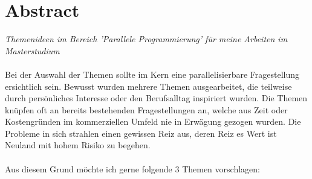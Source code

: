 \documentclass{article}
\begin{document}
\section*{Abstract}
\textit{Themenideen im Bereich 'Parallele Programmierung' für meine Arbeiten im Masterstudium} \\
\vspace{3pt} \\
Bei der Auswahl der Themen sollte im Kern eine parallelisierbare Fragestellung ersichtlich sein. Bewusst wurden mehrere Themen ausgearbeitet, die teilweise durch persönliches Interesse oder den Berufsalltag inspiriert wurden. Die Themen knüpfen oft an bereits bestehenden Fragestellungen an, welche aus Zeit oder Kostengründen im kommerziellen Umfeld nie in Erwägung gezogen wurden. Die Probleme in sich strahlen einen gewissen Reiz aus, deren Reiz es Wert ist Neuland mit hohem Risiko zu begehen. \\
\vspace{0.5pt} \\
Aus diesem Grund möchte ich gerne folgende 3 Themen vorschlagen:
\end{document}
